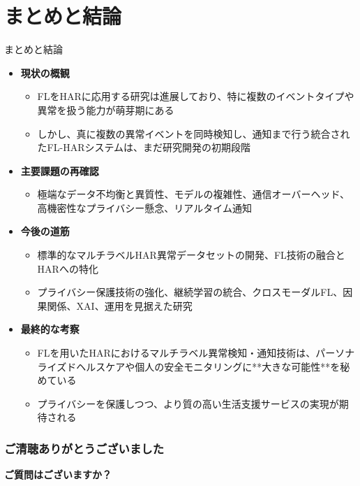 \documentclass[unicode,12pt,aspectratio=169,dvipdfmx]{beamer}
\begin{document}
\section{まとめと結論}
\begin{frame}{まとめと結論}
\begin{itemize}
    \item \textbf{現状の概観}
    \begin{itemize}
        \item FLをHARに応用する研究は進展しており、特に複数のイベントタイプや異常を扱う能力が萌芽期にある
        \item しかし、真に複数の異常イベントを同時検知し、通知まで行う統合されたFL-HARシステムは、まだ研究開発の初期段階
    \end{itemize}
    \item \textbf{主要課題の再確認}
    \begin{itemize}
        \item 極端なデータ不均衡と異質性、モデルの複雑性、通信オーバーヘッド、高機密性なプライバシー懸念、リアルタイム通知
    \end{itemize}
    \item \textbf{今後の道筋}
    \begin{itemize}
        \item 標準的なマルチラベルHAR異常データセットの開発、FL技術の融合とHARへの特化
        \item プライバシー保護技術の強化、継続学習の統合、クロスモーダルFL、因果関係、XAI、運用を見据えた研究
    \end{itemize}
    \item \textbf{最終的な考察}
    \begin{itemize}
        \item FLを用いたHARにおけるマルチラベル異常検知・通知技術は、パーソナライズドヘルスケアや個人の安全モニタリングに**大きな可能性**を秘めている
        \item プライバシーを保護しつつ、より質の高い生活支援サービスの実現が期待される
    \end{itemize}
\end{itemize}
\end{frame}

\begin{frame}
\frametitle{ご清聴ありがとうございました}
\centering
\Huge{\textbf{ご質問はございますか？}}
\vfill
\end{frame}
\end{document}
